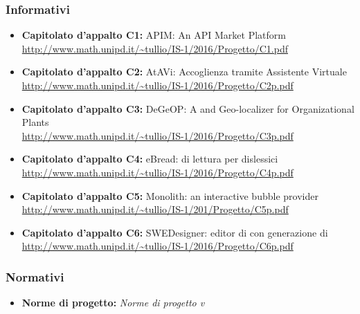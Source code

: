     \subsubsection{Informativi}
      \begin{itemize}
        \item \textbf{Capitolato d'appalto C1:} APIM: An API Market Platform \\
        \url{http://www.math.unipd.it/~tullio/IS-1/2016/Progetto/C1.pdf}
        \item \textbf{Capitolato d'appalto C2:} AtAVi: Accoglienza tramite Assistente Virtuale \\
        \url{http://www.math.unipd.it/~tullio/IS-1/2016/Progetto/C2p.pdf}
        \item \textbf{Capitolato d'appalto C3:} DeGeOP: A  and Geo-localizer  for
        Organizational Plants \\
        \url{http://www.math.unipd.it/~tullio/IS-1/2016/Progetto/C3p.pdf}
        \item \textbf{Capitolato d'appalto C4:} eBread:  di lettura per dislessici \\
        \url{http://www.math.unipd.it/~tullio/IS-1/2016/Progetto/C4p.pdf}
        \item \textbf{Capitolato d'appalto C5:} Monolith: an interactive bubble provider \\
        \url{http://www.math.unipd.it/~tullio/IS-1/201/Progetto/C5p.pdf}
        \item \textbf{Capitolato d'appalto C6:} SWEDesigner: editor di   con generazione di  \\
        \url{http://www.math.unipd.it/~tullio/IS-1/2016/Progetto/C6p.pdf}
      \end{itemize}
    \subsubsection{Normativi}
      \begin{itemize}
        \item \textbf{Norme di progetto:} \emph{Norme di progetto v\VersioneNP{}}
      \end{itemize}

